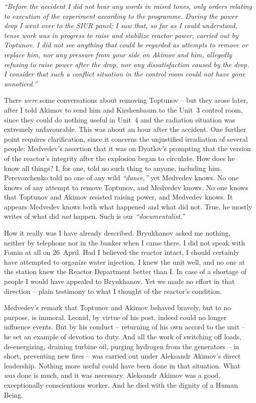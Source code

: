 \documentclass[openright]{bookest}
\begin{document}
\begin{personal}
\textit{``Before the accident I did not hear any words in raised tones, only orders relating to execution of the experiment according to the programme. During the power drop I went over to the SIUR panel; I saw that, so far as I could understand, tense work was in progress to raise and stabilize reactor power, carried out by Toptunov. I did not see anything that could be regarded as attempts to remove or replace him, nor any pressure from your side on Akimov and him, allegedly refusing to raise power after the drop, nor any dissatisfaction caused by the drop. I consider that such a conflict situation in the control room could not have gone unnoticed.''}
\end{personal}

There \textit{were} some conversations about removing Toptunov -- but they arose later, after I told Akimov to send him and Kirshenbaum to the Unit~3 control room, since they could do nothing useful in Unit~4 and the radiation situation was extremely unfavourable. This was about an hour after the accident. One further point requires clarification, since it concerns the unjustified irradiation of several people: Medvedev's assertion that it was on Dyatlov's prompting that the version of the reactor's integrity after the explosion began to circulate. How does he know all things? I, for one, told no such thing to anyone, including him. Perevozchenko told no one of any wild \textit{``dance,''} yet Medvedev knows. No one knows of any attempt to remove Toptunov, and Medvedev knows. No one knows that Toptunov and Akimov resisted raising power, and Medvedev knows. It appears Medvedev knows both what happened and what did not. True, he mostly writes of what did \textit{not} happen. Such is our \textit{``documentalist.''}

How it really was I have already described. Bryukhanov asked me nothing, neither by telephone nor in the bunker when I came there. I did not speak with Fomin at all on 26~April. Had I believed the reactor intact, I should certainly have attempted to organize water injection. I knew the unit well, and no one at the station knew the Reactor Department better than I. In case of a shortage of people I would have appealed to Bryukhanov. Yet we made no effort in that direction -- plain testimony to what I thought of the reactor's condition.

Medvedev's remark that Toptunov and Akimov behaved bravely, but to no purpose, is immoral. Leonid, by virtue of his post, indeed could no longer influence events. But by his conduct -- returning of his own accord to the unit -- he set an example of devotion to duty. And all the work of switching off loads, de-energizing, draining turbine oil, purging hydrogen from the generators -- in short, preventing new fires -- was carried out under Aleksandr Akimov's direct leadership. Nothing more useful could have been done in that situation. What \textit{was} done is much, and it was necessary. Aleksandr Akimov was a good, exceptionally conscientious worker. And he died with the dignity of a Human Being.
\end{document}
